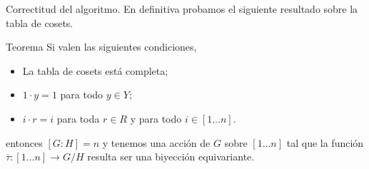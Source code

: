 \documentclass[aspectratio=169, 9pt]{beamer}
\renewcommand\qedsymbol{\textcolor{orange}{$\blacksquare$}}
\newcommand{\In}{[1 \dots n]}
\newcommand{\ol}{\overline}
\begin{document}
\begin{frame}[fragile]{Correctitud del algoritmo.}
	En definitiva probamos el siguiente resultado sobre la tabla de cosets.
	
	\begin{alertblock}{Teorema}
		Si valen las siguientes condiciones,
		\begin{itemize}
			\item La tabla de cosets está completa;
			\item $1\cdot y = 1$ para todo $y \in Y$;
			\item $i \cdot r  = i$ para toda $r \in R$ y para todo $i \in \In$.
		\end{itemize}
		
		entonces $[G:H] = n$ y tenemos una acción de $G$ sobre $\In$ tal que la función $\ol \tau: \In \to G/H$ resulta ser una biyección equivariante.
	\end{alertblock}
	\medskip
\end{frame}

%	
%			
%		
\end{document}

